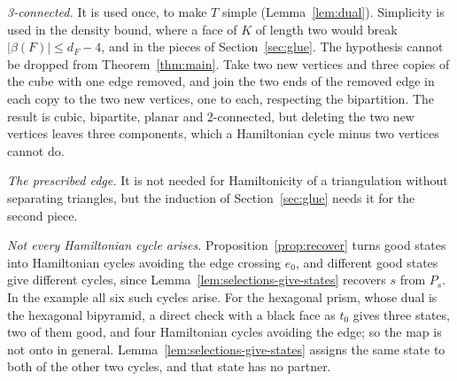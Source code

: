 \documentclass[10pt]{amsart}
\numberwithin{equation}{section}
\theoremstyle{definition}
\theoremstyle{remark}
\newcommand{\T}{T}
\begin{document}
\emph{3-connected.}
It is used once, to make $\T$ simple (Lemma~\ref{lem:dual}).
Simplicity is used in the density bound, where a face of $K$ of length two would break $|\beta(F)|\le d_F-4$, and in the pieces of Section~\ref{sec:glue}.
The hypothesis cannot be dropped from Theorem~\ref{thm:main}.
Take two new vertices and three copies of the cube with one edge removed, and join the two ends of the removed edge in each copy to the two new vertices, one to each, respecting the bipartition.
The result is cubic, bipartite, planar and 2-connected, but deleting the two new vertices leaves three components, which a Hamiltonian cycle minus two vertices cannot do.

\emph{The prescribed edge.}
It is not needed for Hamiltonicity of a triangulation without separating triangles, but the induction of Section~\ref{sec:glue} needs it for the second piece.

\emph{Not every Hamiltonian cycle arises.}
Proposition~\ref{prop:recover} turns good states into Hamiltonian cycles avoiding the edge crossing $e_0$, and different good states give different cycles, since Lemma~\ref{lem:selections-give-states} recovers $s$ from $P_s$.
In the example all six such cycles arise.
For the hexagonal prism, whose dual is the hexagonal bipyramid, a direct check with a black face as $t_0$ gives three states, two of them good, and four Hamiltonian cycles avoiding the edge; so the map is not onto in general.
Lemma~\ref{lem:selections-give-states} assigns the same state to both of the other two cycles, and that state has no partner.



\end{document}
